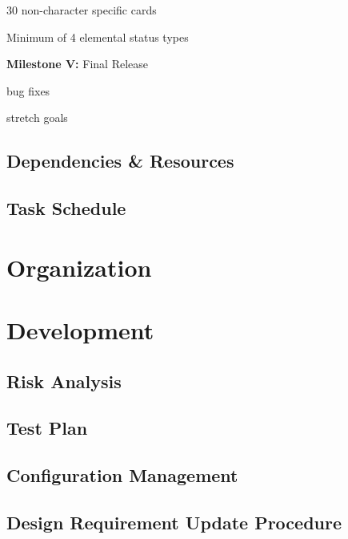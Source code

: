 \documentclass[12pt,titlepage]{article}
\begin{document}
\begin{todolist}
\begin{todolist}
                \item 30 non-character specific cards
                \item Minimum of 4 elemental status types
            \end{todolist}
        \item \textbf{Milestone V:} Final Release
            \begin{todolist}
                \item bug fixes
                \item stretch goals
            \end{todolist}
    \end{todolist}

\subsection{Dependencies \& Resources}

\subsection{Task Schedule}

\section{Organization}

\section{Development}

\subsection{Risk Analysis}

\subsection{Test Plan}

\subsection{Configuration Management}

\subsection{Design Requirement Update Procedure}
\end{document}

